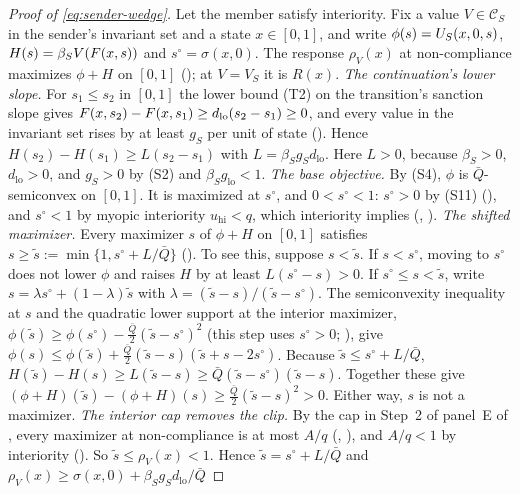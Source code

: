 \begin{proof}[Proof of \eqref{eq:sender-wedge}]
Let the member satisfy interiority. Fix a value
$V\in\mathcal C_S$ in the sender's invariant set and a state $x\in[0,1]$, and write $\phi(s)=U_S(x,0,s)$,
$H(s)=\beta_SV(F(x,s))$ and $s^\circ=\sigma(x,0)$. The response $\rho_V(x)$ at
non-compliance maximizes $\phi+H$ on $[0,1]$ (); at $V=V_S$ it is
$R(x)$. \emph{The continuation's lower slope.} For $s_1\le s_2$ in $[0,1]$ the
lower bound (T2) on the transition's sanction slope gives $F(x,s_2)-F(x,s_1)\ge d_{\mathrm{lo}}(s_2-s_1)\ge0$,
and every value in the invariant set rises by at least $g_S$ per unit of state
(). Hence $H(s_2)-H(s_1)\ge L(s_2-s_1)$ with
$L=\beta_Sg_Sd_{\mathrm{lo}}$. Here $L>0$, because $\beta_S>0$, $d_{\mathrm{lo}}>0$,
and $g_S>0$ by (S2) and $\beta_Sg_{\mathrm{lo}}<1$.
\emph{The base objective.} By (S4), $\phi$ is $\bar Q$-semiconvex on $[0,1]$. It
is maximized at $s^\circ$, and $0<s^\circ<1$: $s^\circ>0$ by (S11)
(), and $s^\circ<1$ by myopic interiority $u_{\mathrm{hi}}<q$,
which interiority implies (, ).
\emph{The shifted maximizer.} Every maximizer $s$ of $\phi+H$ on $[0,1]$ satisfies
$s\ge \tilde s:=\min\{1,s^\circ+L/\bar Q\}$
(). To see this, suppose $s<\tilde s$.
If $s<s^\circ$, moving to $s^\circ$ does not lower $\phi$ and raises $H$ by at least
$L(s^\circ-s)>0$. If $s^\circ\le s<\tilde s$, write $s=\lambda s^\circ+(1-\lambda)\tilde s$ with
$\lambda=(\tilde s-s)/(\tilde s-s^\circ)$. The semiconvexity inequality at $s$ and the quadratic lower
support at the interior maximizer, $\phi(\tilde s)\ge \phi(s^\circ)-\tfrac{\bar Q}{2}(\tilde s-s^\circ)^2$
(this step uses $s^\circ>0$;
), give
$\phi(s)\le \phi(\tilde s)+\tfrac{\bar Q}{2}(\tilde s-s)(\tilde s+s-2s^\circ)$. Because $\tilde s\le s^\circ+L/\bar Q$,
$H(\tilde s)-H(s)\ge L(\tilde s-s)\ge\bar Q(\tilde s-s^\circ)(\tilde s-s)$. Together these give
$(\phi+H)(\tilde s)-(\phi+H)(s)\ge\tfrac{\bar Q}{2}(\tilde s-s)^2>0$. Either way, $s$ is not a
maximizer.
\emph{The interior cap removes the clip.} By the cap in Step~2 of panel~E of
, every maximizer at non-compliance is at most $A/q$
(, ), and $A/q<1$ by
interiority (). So $\tilde s\le\rho_V(x)<1$. Hence $\tilde s=s^\circ+L/\bar Q$
and $\rho_V(x)\ge\sigma(x,0)+\beta_Sg_Sd_{\mathrm{lo}}/\bar Q$

\end{proof}
